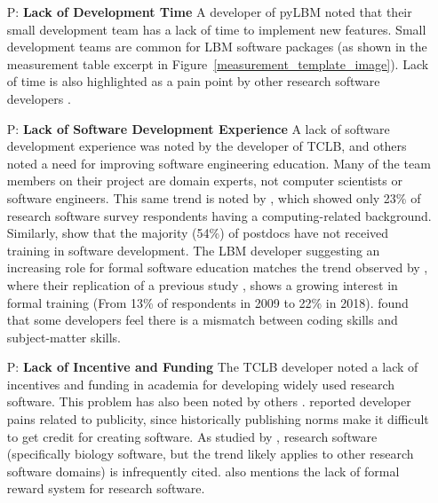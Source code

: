 \documentclass[final, 3p, times, authoryear]{elsarticle}
\newcounter{pnum} %
\begin{document}
\begin{enumerate}

	\item[P\refstepcounter{pnum}\thepnum \label{P_LackDevTime}:] \textbf{Lack of
	Development Time} A developer of pyLBM noted that their small development
	team has a lack of time to implement new features. Small development teams
	are common for LBM software packages (as shown in the measurement table
	excerpt in Figure~\ref{measurement_template_image}). Lack of time is also
	highlighted as a pain point by other research software developers
	\citet{PintoEtAl2018, PintoEtAl2016, WieseEtAl2019}.

	\item[P\refstepcounter{pnum}\thepnum \label{P_LackSoftDevExp}:] \textbf{Lack
	of Software Development Experience} A lack of software development
	experience was noted by the developer of TCLB, and others noted a need for
	improving software engineering education. Many of the team members on their
	project are domain experts, not computer scientists or software engineers.
	This same trend is noted by \citep{Nguyen-HoanEtAl2010}, which showed only
	23\% of research software survey respondents having a computing-related
	background. Similarly, \citep{UditAndKatz2017} show that the majority (54\%)
	of postdocs have not received training in software development.  The LBM
	developer suggesting an increasing role for formal software education
	matches the trend observed by \citet{PintoEtAl2018}, where their replication
	of a previous study \citep{HannayEtAl2009}, shows a growing interest in
	formal training (From 13\% of respondents in 2009 to 22\% in 2018).
	\citep{PintoEtAl2018} found that some developers feel there is a mismatch
	between coding skills and subject-matter skills. 
	
	\item[P\refstepcounter{pnum}\thepnum \label{P_LackFunding}:] \textbf{Lack of
	Incentive and Funding} The TCLB developer noted a lack of incentives and
	funding in academia for developing widely used research software. This
	problem has also been noted by others \citep{gewaltig2012quality, Goble2014,
	KaterbowAndFeulner2018}.  \citet{WieseEtAl2019} reported developer pains
	related to publicity, since historically publishing norms make it difficult
	to get credit for creating software.  As studied by
	\citet{HowisonAndBullard2016}, research software (specifically biology
	software, but the trend likely applies to other research software domains)
	is infrequently cited.  \citep{PintoEtAl2018} also mentions the lack of
	formal reward system for research software.


\end{enumerate}
\end{document}
